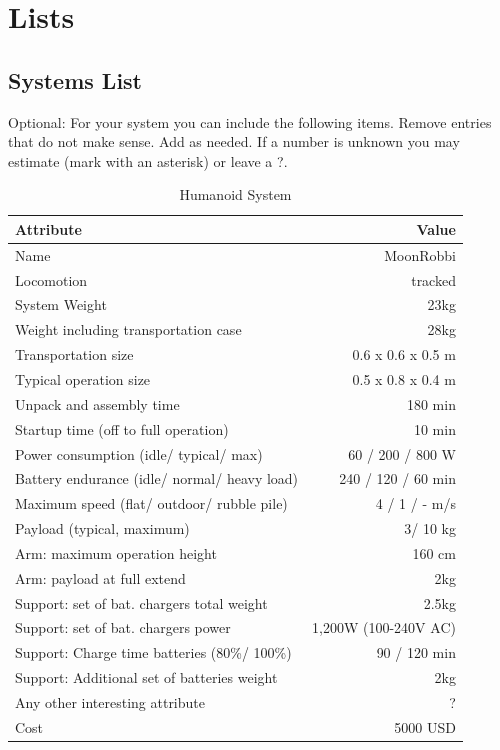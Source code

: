 \documentclass[journal]{IEEEtran}
\begin{document}
\section{Lists}
\subsection{Systems List}
Optional: For your system you can include the following items. Remove entries that do not make sense. Add as needed. If a number is unknown you may estimate (mark with an asterisk) or leave a ?.

\begin{table}
\renewcommand{\arraystretch}{1}
 \tabcolsep=0.1cm
\caption{Humanoid System}
\label{tab:SystemRobot1}
\centering
\begin{tabular}{|l|r|}
\hline
Attribute & Value \\ \hline
Name & MoonRobbi \\
Locomotion & tracked \\
System Weight & 23kg \\
Weight including transportation case & 28kg \\
Transportation size & 0.6 x 0.6 x 0.5 m \\
Typical operation size & 0.5 x 0.8  x 0.4 m \\
Unpack and assembly time & 180 min \\
Startup time (off to full operation) & 10 min \\
Power consumption (idle/ typical/ max) & 60 / 200 / 800 W \\
Battery endurance (idle/ normal/ heavy load) & 240 / 120 / 60 min\\
Maximum speed (flat/ outdoor/ rubble pile) & 4 / 1 / - m/s\\
Payload (typical, maximum) & 3/ 10 kg\\
Arm: maximum operation height & 160 cm \\
Arm: payload at full extend & 2kg\\
Support: set of bat. chargers total weight & 2.5kg\\
Support: set of bat. chargers power & 1,200W (100-240V AC)\\
Support: Charge time batteries (80\%/ 100\%) & 90 / 120 min\\
Support: Additional set of batteries weight & 2kg\\
Any other interesting attribute & ?\\
Cost & 5000 USD \\
\hline
\end{tabular}
\end{table}
\end{document}
